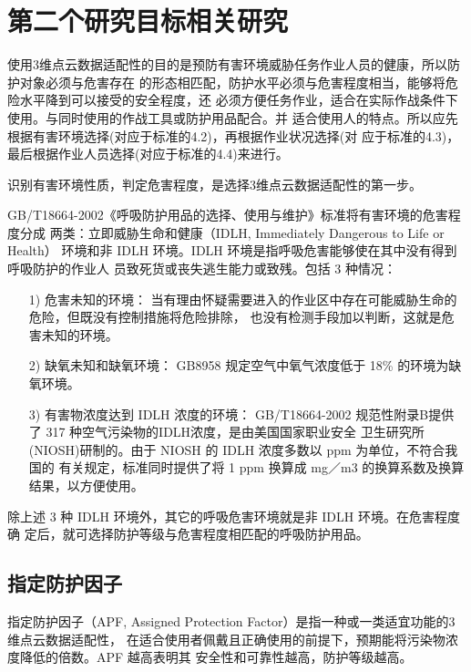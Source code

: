 \documentclass[a4paper,12pt]{ctexbook}	%
\begin{document}
\section{第二个研究目标相关研究}

使用3维点云数据适配性的目的是预防有害环境威胁任务作业人员的健康，所以防护对象必须与危害存在
的形态相匹配，防护水平必须与危害程度相当，能够将危险水平降到可以接受的安全程度，还
必须方便任务作业，适合在实际作战条件下使用。与同时使用的作战工具或防护用品配合。并
适合使用人的特点。所以应先根据有害环境选择(对应于标准的4.2)，再根据作业状况选择(对
应于标准的4.3)，最后根据作业人员选择(对应于标准的4.4)来进行。

识别有害环境性质，判定危害程度，是选择3维点云数据适配性的第一步。


GB/T18664-2002《呼吸防护用品的选择、使用与维护》标准将有害环境的危害程度分成
两类：立即威胁生命和健康（IDLH, Immediately Dangerous to Life or Health）
环境和非 IDLH 环境。IDLH 环境是指呼吸危害能够使在其中没有得到呼吸防护的作业人
员致死货或丧失逃生能力或致残。包括 3 种情况：

\begin{itemize}
\setlength{\parskip}{0pt}
\item[1)]
{\heiti
危害未知的环境：
}
当有理由怀疑需要进入的作业区中存在可能威胁生命的危险，但既没有控制措施将危险排除，
也没有检测手段加以判断，这就是危害未知的环境。

\item[2)]
{\heiti
缺氧未知和缺氧环境：
}
GB8958 规定空气中氧气浓度低于 18\% 的环境为缺氧环境。
\item[3)]
{\heiti
有害物浓度达到 IDLH 浓度的环境：
}
GB/T18664-2002 规范性附录B提供了 317 种空气污染物的IDLH浓度，是由美国国家职业安全
卫生研究所(NIOSH)研制的。由于 NIOSH 的 IDLH 浓度多数以 ppm 为单位，不符合我国的
有关规定，标准同时提供了将 1 ppm 换算成 mg／m3 的换算系数及换算结果，以方便使用。

\end{itemize}

除上述 3 种 IDLH 环境外，其它的呼吸危害环境就是非 IDLH 环境。在危害程度确
定后，就可选择防护等级与危害程度相匹配的呼吸防护用品。

\subsection{指定防护因子}

指定防护因子（APF, Assigned Protection Factor）是指一种或一类适宜功能的3维点云数据适配性，
在适合使用者佩戴且正确使用的前提下，预期能将污染物浓度降低的倍数。APF 越高表明其
安全性和可靠性越高，防护等级越高。
\end{document}
